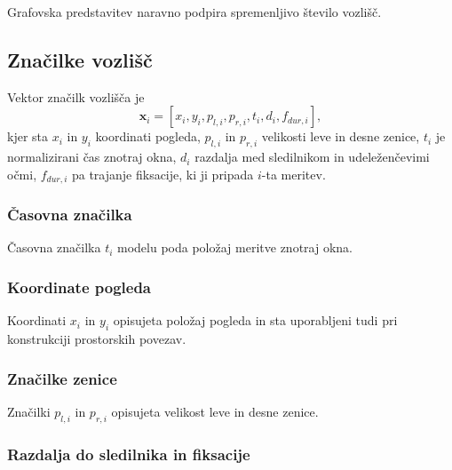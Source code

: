 Grafovska predstavitev naravno podpira spremenljivo število vozlišč.

\subsection{Značilke vozlišč}
\label{subsec:znacilke-vozlisca}


Vektor značilk vozlišča je
\begin{equation}
    \mathbf{x}_i =
    \left[
        x_i,
        y_i,
        p_{l,i},
        p_{r,i},
        t_i,
        d_i,
        f_{dur,i}
    \right],
\end{equation}
kjer sta $x_i$ in $y_i$ koordinati pogleda, $p_{l,i}$ in $p_{r,i}$ velikosti leve in desne zenice, $t_i$ je normalizirani čas znotraj okna, $d_i$ razdalja med sledilnikom in udeleženčevimi očmi, $f_{dur,i}$ pa trajanje fiksacije, ki ji pripada $i$-ta meritev.


\subsubsection{Časovna značilka}

Časovna značilka $t_i$ modelu poda položaj meritve znotraj okna.

\subsubsection{Koordinate pogleda}

Koordinati $x_i$ in $y_i$ opisujeta položaj pogleda in sta uporabljeni tudi pri konstrukciji prostorskih povezav.

\subsubsection{Značilke zenice}

Značilki $p_{l,i}$ in $p_{r,i}$ opisujeta velikost leve in desne zenice.

\subsubsection{Razdalja do sledilnika in fiksacije}

